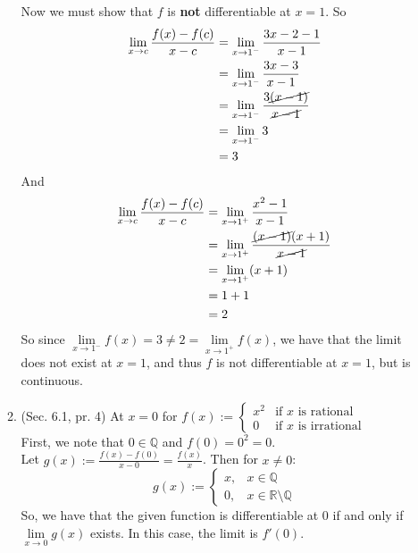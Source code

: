 \documentclass[12pt,letterpaper]{article}
\newcommand{\R}{\mathbb{R}}
\newcommand{\Q}{\mathbb{Q}}
\theoremstyle{case}
\theoremstyle{definition}
\begin{document}
\begin{enumerate}
\begin{enumerate}
			Now we must show that $f$ is \textbf{not} differentiable at $x=1$. So
			\begin{align*}
				\lim\limits_{x \to c} \frac{f(x)-f(c)}{x-c} &= \lim\limits_{x \to 1^-} \frac{3x-2-1}{x-1} \\
				&= \lim\limits_{x \to 1^-} \frac{3x-3}{x-1} \\
				&= \lim\limits_{x \to 1^-} \frac{3\cancel{(x-1)}}{\cancel{x-1}} \\
				&= \lim\limits_{x \to 1^-} 3 \\
				&= 3
			\end{align*}
			And
			\begin{align*}
				\lim\limits_{x \to c} \frac{f(x)-f(c)}{x-c} &= \lim\limits_{x \to 1^+} \frac{x^2-1}{x-1} \\
				&= \lim\limits_{x \to 1^+} \frac{\cancel{(x-1)}(x+1)}{\cancel{x-1}} \\
				&= \lim\limits_{x \to 1^+} (x+1) \\
				&= 1+1 \\
				&= 2
			\end{align*}
			So since $\lim\limits_{x \to 1^-} f(x) = 3 \neq 2 = \lim\limits_{x \to 1^+} f(x)$, we have that the limit does not exist at $x=1$, and thus $f$ is not differentiable at $x=1$, but is continuous.
			\item (Sec. 6.1, pr. 4) At $x=0$ for $f(x):=\begin{cases}
				x^2 &\text{if } x \text{ is rational} \\
				0 &\text{if } x \text{ is irrational}
			\end{cases}$\\
			
			First, we note that $0 \in \Q$ and $f(0)=0^2=0$.\\
			
			Let $g(x):=\frac{f(x)-f(0)}{x-0}=\frac{f(x)}{x}$. Then for $x \neq 0$:
			\[g(x):=\begin{cases}
				x, & x \in \Q \\
				0, & x \in \R \setminus \Q
			\end{cases}\]
			So, we have that the given function is differentiable at 0 if and only if $\lim\limits_{x \to 0} g(x)$ exists. In this case, the limit is $f'(0)$.\\
			

\end{enumerate}
\end{enumerate}
\end{document}
